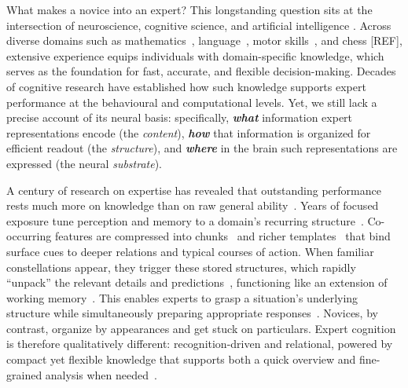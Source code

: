 \documentclass[preprint,12pt]{elsarticle}
\begin{document}
What makes a novice into an expert? This longstanding question sits at the intersection of neuroscience, cognitive science, and artificial intelligence \cite{bilalic_mechanisms_2010,ericsson2007capturing,lake2017building,mcgrath2022acquisition,ericsson1993role,anderson1982acquisition}. Across diverse domains such as mathematics~\cite{grabner_individual_2007, pesenti_mental_2001}, language~\cite{siegmund_understanding_2014,floyd_decoding_2017}, motor skills~\cite{gerloff_stimulation_1997,jancke_architecture_2009,naito_efficient_2014}, and chess [REF], extensive experience equips individuals with domain-specific knowledge, which serves as the foundation for fast, accurate, and flexible decision-making. Decades of cognitive research have established how such knowledge supports expert performance at the behavioural and computational levels. Yet, we still lack a precise account of its neural basis: specifically, \textbf{\emph{what}} information expert representations encode (the \emph{content}), \textbf{\emph{how}} that information is organized for efficient readout (the \emph{structure}), and \textbf{\emph{where}} in the brain such representations are expressed (the neural \emph{substrate}). 

A century of research on expertise has revealed that outstanding performance rests much more on knowledge than on raw general ability~\cite{gobet2004moves,gobet2017understanding}. Years of focused exposure tune perception and memory to a domain's recurring structure~\cite{gobet2001chunking,ericsson1993role}. Co-occurring features are compressed into chunks~\cite{chase1973perception} and richer templates~\cite{gobet1996templates} that bind surface cues to deeper relations and typical courses of action. When familiar constellations appear, they trigger these stored structures, which rapidly ``unpack'' the relevant details and predictions~\cite{chase1973perception,gobet1996templates,gobet2001chunking}, functioning like an extension of working memory~\cite{ericsson1995long}. This enables experts to grasp a situation's underlying structure while simultaneously preparing appropriate responses~\cite{boggan2012chess}. Novices, by contrast, organize by appearances and get stuck on particulars. Expert cognition is therefore qualitatively different: recognition-driven and relational, powered by compact yet flexible knowledge that supports both a quick overview and fine-grained analysis when needed~\cite{bilalic2017neuroscience,bilalic2018double}.
\end{document}
